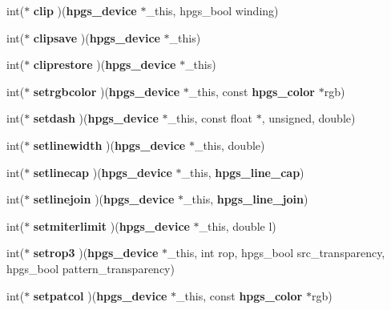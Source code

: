 \begin{CompactItemize}
\item 
int($\ast$ \textbf{clip} )({\bf hpgs\_\-device} $\ast$\_\-this, hpgs\_\-bool winding)\label{structhpgs__device__vtable__st_ebf6c867c63f6073f6331b5437c110f2}

\item 
int($\ast$ \textbf{clipsave} )({\bf hpgs\_\-device} $\ast$\_\-this)\label{structhpgs__device__vtable__st_57bb09f77e43229624be5b3de22b9008}

\item 
int($\ast$ \textbf{cliprestore} )({\bf hpgs\_\-device} $\ast$\_\-this)\label{structhpgs__device__vtable__st_ca68f41a1cce4a6e60cae48418dd6665}

\item 
int($\ast$ \textbf{setrgbcolor} )({\bf hpgs\_\-device} $\ast$\_\-this, const {\bf hpgs\_\-color} $\ast$rgb)\label{structhpgs__device__vtable__st_ca3c049976707c1a86bdfcfaf195d105}

\item 
int($\ast$ \textbf{setdash} )({\bf hpgs\_\-device} $\ast$\_\-this, const float $\ast$, unsigned, double)\label{structhpgs__device__vtable__st_e2111971e1822582a9d7ade1f16e1bab}

\item 
int($\ast$ \textbf{setlinewidth} )({\bf hpgs\_\-device} $\ast$\_\-this, double)\label{structhpgs__device__vtable__st_cbf75582e190064c7a024cba5587c4f8}

\item 
int($\ast$ \textbf{setlinecap} )({\bf hpgs\_\-device} $\ast$\_\-this, {\bf hpgs\_\-line\_\-cap})\label{structhpgs__device__vtable__st_57e5a4206e37340fbdadd216a7b10bae}

\item 
int($\ast$ \textbf{setlinejoin} )({\bf hpgs\_\-device} $\ast$\_\-this, {\bf hpgs\_\-line\_\-join})\label{structhpgs__device__vtable__st_5bbc58c850e20ed95e37d1d6d4503579}

\item 
int($\ast$ \textbf{setmiterlimit} )({\bf hpgs\_\-device} $\ast$\_\-this, double l)\label{structhpgs__device__vtable__st_6b98bf0b2df5fa5c2b0493b9224e9ac8}

\item 
int($\ast$ \textbf{setrop3} )({\bf hpgs\_\-device} $\ast$\_\-this, int rop, hpgs\_\-bool src\_\-transparency, hpgs\_\-bool pattern\_\-transparency)\label{structhpgs__device__vtable__st_244148e4288962733ef93590bc6b0f9b}

\item 
int($\ast$ \textbf{setpatcol} )({\bf hpgs\_\-device} $\ast$\_\-this, const {\bf hpgs\_\-color} $\ast$rgb)\label{structhpgs__device__vtable__st_ef383649215701a43c5e589fe5070b11}


\end{CompactItemize}

